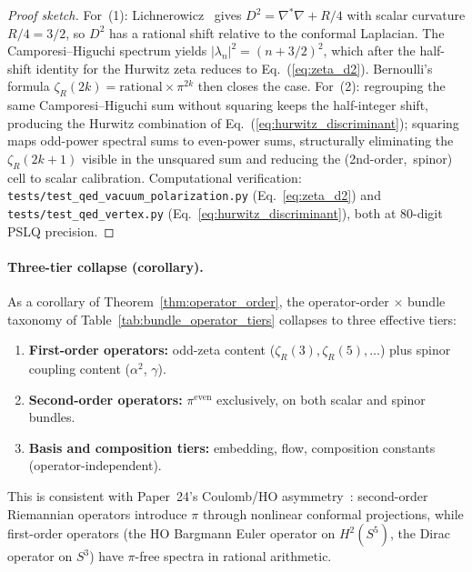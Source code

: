 \documentclass[aps,pra,twocolumn,superscriptaddress,longbibliography]{revtex4-2}
\begin{document}
\begin{proof}[Proof sketch]
For~(1): Lichnerowicz~\cite{lichnerowicz1963} gives $D^2 = \nabla^*
\nabla + R/4$ with scalar curvature $R/4 = 3/2$, so $D^2$ has a
rational shift relative to the conformal Laplacian.  The
Camporesi--Higuchi spectrum yields $|\lambda_n|^2 = (n+3/2)^2$,
which after the half-shift identity for the Hurwitz zeta reduces to
Eq.~(\ref{eq:zeta_d2}).  Bernoulli's formula $\zeta_R(2k) =
\mathrm{rational} \times \pi^{2k}$ then closes the case.  For~(2):
regrouping the same Camporesi--Higuchi sum without squaring keeps the
half-integer shift, producing the Hurwitz combination of
Eq.~(\ref{eq:hurwitz_discriminant}); squaring maps odd-power spectral
sums to even-power sums, structurally eliminating the $\zeta_R(2k{+}1)$
visible in the unsquared sum and reducing the (2nd-order,~spinor) cell
to scalar calibration.  Computational verification:
\texttt{tests/test\_qed\_vacuum\_polarization.py}
(Eq.~\ref{eq:zeta_d2}) and \texttt{tests/test\_qed\_vertex.py}
(Eq.~\ref{eq:hurwitz_discriminant}), both at 80-digit PSLQ precision.
\end{proof}

\paragraph{Three-tier collapse (corollary).}
As a corollary of Theorem~\ref{thm:operator_order}, the
operator-order $\times$ bundle taxonomy of
Table~\ref{tab:bundle_operator_tiers} collapses to three effective
tiers:
\begin{enumerate}
  \item \textbf{First-order operators:} odd-zeta content
    ($\zeta_R(3), \zeta_R(5), \ldots$) plus spinor coupling content
    ($\alpha^2$, $\gamma$).
  \item \textbf{Second-order operators:} $\pi^{\text{even}}$ exclusively,
    on both scalar and spinor bundles.
  \item \textbf{Basis and composition tiers:} embedding, flow,
    composition constants (operator-independent).
\end{enumerate}
This is consistent with Paper~24's Coulomb/HO
asymmetry~\cite{loutey_paper24}: second-order Riemannian operators
introduce $\pi$ through nonlinear conformal projections, while
first-order operators (the HO Bargmann Euler operator on
$H^2(S^5)$, the Dirac operator on $S^3$) have $\pi$-free spectra
in rational arithmetic.
\end{document}
